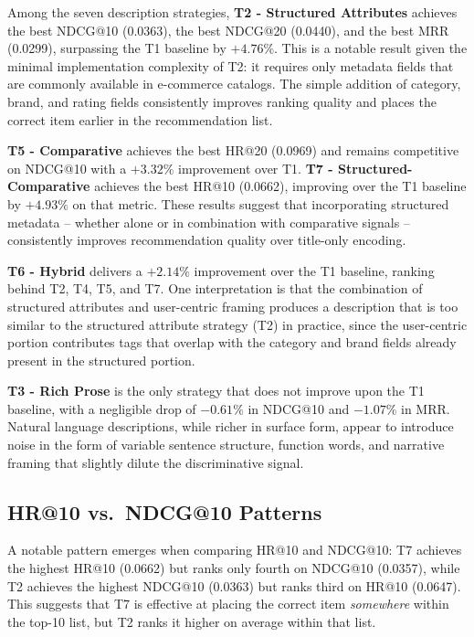 \documentclass[12pt,a4paper]{report}
\begin{document}
\justifying
Among the seven description strategies, \textbf{T2 - Structured Attributes}
achieves the best NDCG@10 (0.0363), the best NDCG@20 (0.0440), and the best
MRR (0.0299), surpassing the T1 baseline by \(+4.76\%\). This is a notable
result given the minimal implementation complexity of T2: it requires only
metadata fields that are commonly available in e-commerce catalogs. The simple
addition of category, brand, and rating fields consistently improves ranking
quality and places the correct item earlier in the recommendation list.

\textbf{T5 - Comparative} achieves the best HR@20 (0.0969) and remains
competitive on NDCG@10 with a \(+3.32\%\) improvement over T1. \textbf{T7 -
Structured-Comparative} achieves the best HR@10 (0.0662), improving over the
T1 baseline by \(+4.93\%\) on that metric. These results suggest that
incorporating structured metadata -- whether alone or in combination with
comparative signals -- consistently improves recommendation quality over
title-only encoding.

\textbf{T6 - Hybrid} delivers a \(+2.14\%\) improvement over the T1 baseline,
ranking behind T2, T4, T5, and T7. One interpretation is that the combination
of structured attributes and user-centric framing produces a description that
is too similar to the structured attribute strategy (T2) in practice, since
the user-centric portion contributes tags that overlap with the category and
brand fields already present in the structured portion.

\textbf{T3 - Rich Prose} is the only strategy that does not improve upon the
T1 baseline, with a negligible drop of \(-0.61\%\) in NDCG@10 and \(-1.07\%\) in
MRR. Natural language descriptions, while richer in surface form, appear to
introduce noise in the form of variable sentence structure, function words, and
narrative framing that slightly dilute the discriminative signal.

\subsection*{HR@10 vs.\ NDCG@10 Patterns}

\justifying
A notable pattern emerges when comparing HR@10 and NDCG@10: T7 achieves the
highest HR@10 (0.0662) but ranks only fourth on NDCG@10 (0.0357), while T2
achieves the highest NDCG@10 (0.0363) but ranks third on HR@10 (0.0647). This
suggests that T7 is effective at placing the correct item \emph{somewhere}
within the top-10 list, but T2 ranks it higher on average within that list.
\end{document}
